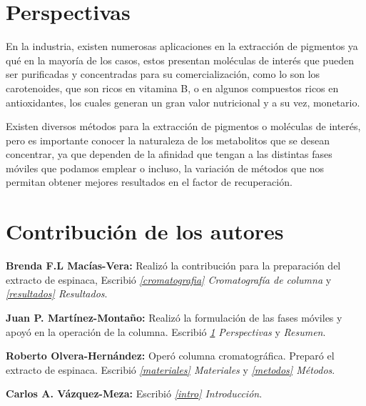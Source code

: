 \documentclass{ITESO-Reporte}
\begin{document}
\section{Perspectivas}\label{perspectivas}

En la industria, existen numerosas aplicaciones en la extracción de pigmentos ya qué en la mayoría de los casos, estos presentan moléculas de interés que pueden ser purificadas y concentradas para su comercialización, como lo son los carotenoides, que son ricos en vitamina B, o en algunos compuestos ricos en antioxidantes, los cuales generan un gran valor nutricional y a su vez, monetario.

Existen diversos métodos para la extracción de pigmentos o moléculas de interés, pero es importante conocer la naturaleza de los metabolitos que se desean concentrar, ya que dependen de la afinidad que tengan a las distintas fases móviles que podamos emplear o incluso, la variación de métodos que nos permitan obtener mejores resultados en el factor de recuperación.


\section{Contribución de los autores}
{\color{darkgray}\bfseries Brenda F.L Macías-Vera:}\hspace{1em}
Realizó la contribución para la preparación del extracto de espinaca, Escribió \textit{\ref{cromatografia} Cromatografía de columna} y \textit{\ref{resultados} Resultados}.

{\color{darkgray}\bfseries Juan P. Martínez-Montaño:}\hspace{1em}
Realizó la formulación de las fases móviles y apoyó en la operación de la columna. Escribió \textit{\ref{perspectivas} Perspectivas} y \textit{Resumen}.

{\color{darkgray}\bfseries Roberto Olvera-Hernández:}\hspace{1em}
Operó columna cromatográfica. Preparó el extracto de espinaca. Escribió \textit{\ref{materiales} Materiales} y \textit{\ref{metodos} Métodos}.

{\color{darkgray}\bfseries Carlos A. Vázquez-Meza:}\hspace{1em}
Escribió \textit{\ref{intro} Introducción}.

\printbibliography[title=Referencias citadas]
\end{document}
